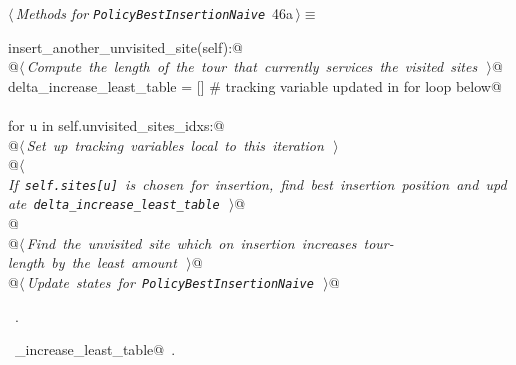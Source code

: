 \documentclass[11.5pt]{report}
\begin{document}
\vspace{-0.8cm}\newchunk 
\begin{flushleft} \small\label{scrap68}\raggedright\small
{} $\langle\,${\itshape Methods for \verb|PolicyBestInsertionNaive|}\nobreak\ {\footnotesize {46a}}$\,\rangle\equiv$
\vspace{-1ex}
\begin{list}{}{} \item
\mbox{}\verb@def insert_another_unvisited_site(self):@\\
\mbox{}\verb@   @\hbox{$\langle\,${\itshape Compute the length of the tour that currently services the visited sites}\nobreak\ {\footnotesize {}}$\,\rangle$}\verb@    @\\
\mbox{}\verb@   delta_increase_least_table = [] # tracking variable updated in for loop below@\\
\mbox{}\verb@@\\
\mbox{}\verb@   for u in self.unvisited_sites_idxs:@\\
\mbox{}\verb@      @\hbox{$\langle\,${\itshape Set up tracking variables local to this iteration}\nobreak\ {\footnotesize {}}$\,\rangle$}\verb@@\\
\mbox{}\verb@      @\hbox{$\langle\,${\itshape If \texttt{self.sites[u]} is chosen for insertion, find best insertion position and update \texttt{delta\_increase\_least\_table}}\nobreak\ {\footnotesize {}}$\,\rangle$}\verb@  @\\
\mbox{}\verb@                 @\\
\mbox{}\verb@   @\hbox{$\langle\,${\itshape Find the unvisited site which on insertion increases tour-length by the least amount}\nobreak\ {\footnotesize {}}$\,\rangle$}\verb@     @\\
\mbox{}\verb@   @\hbox{$\langle\,${\itshape Update states for \texttt{PolicyBestInsertionNaive}}\nobreak\ {\footnotesize {}}$\,\rangle$}\verb@ @\\
\mbox{}\verb@@{\NWsep}
\end{list}
\vspace{-1.5ex}
\footnotesize
\begin{list}{}{\setlength{\itemsep}{-\parsep}\setlength{\itemindent}{-\leftmargin}}
\item \NWtxtMacroRefIn\ .
\item \NWtxtIdentsDefed\nobreak\  \verb@delta_increase_least_table@\nobreak\ .
\item{}
\end{list}
\vspace{4ex}
\end{flushleft}
\end{document}
